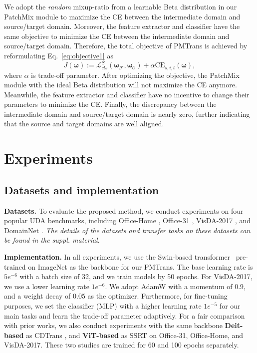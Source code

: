 \documentclass[10pt,twocolumn,letterpaper, ]{article}
\begin{document}
We adopt the \textit{random} mixup-ratio from a learnable Beta distribution in our PatchMix module to maximize the CE between the intermediate domain and source/target domain. Moreover, the feature extractor and classifier have the same objective to minimize the CE between the intermediate domain and source/target domain.
Therefore, the total objective of PMTrans is achieved by reformulating Eq.~\ref{eq:objective1} as
\[
J\left(\boldsymbol{\omega}\right) :=\mathcal{L}_{cls}^{S}(\boldsymbol{\omega}_{\mathcal{F}}, \boldsymbol{\omega}_{\mathcal{C}})+\alpha {\text{CE}}_{s,i,t}(\boldsymbol{\omega}),
\]
where $\alpha$ is trade-off parameter. 
After optimizing the objective, the PatchMix module with the ideal Beta distribution
will not maximize the CE anymore. Meanwhile, the feature extractor and classifier have no incentive to change their parameters to minimize the CE. Finally, the discrepancy between the intermediate domain and  source/target domain is nearly zero, further indicating that the source and target domains are well aligned.
\section{Experiments}
\subsection{Datasets and implementation}
\noindent\textbf{Datasets.} To evaluate the proposed method, we conduct experiments on four popular UDA benchmarks, including Office-Home \cite{VenkateswaraECP17}, Office-31 \cite{SaenkoKFD10}, VisDA-2017 \cite{abs-1710-06924}, and DomainNet \cite{PengBXHSW19}.
\textit{The details of the datasets and transfer tasks on these datasets can be found in the suppl. material}.

\noindent\textbf{Implementation.} In all experiments, we use the Swin-based transformer~\cite{Liu2021SwinTH}  pre-trained on ImageNet \cite{DengDSLL009} as the backbone for our PMTrans. The base learning rate is $5e^{-6}$ with a batch size of 32, and we train models by 50 epochs. For VisDA-2017, we use a lower learning rate $1e^{-6}$. We adopt AdamW \cite{LoshchilovH19} with a momentum of $0.9$, and a weight decay of $0.05$ as the optimizer. Furthermore, for fine-tuning purposes, we set the classifier (MLP) with a higher learning rate $1e^{-5}$ for our main tasks and learn the trade-off parameter adaptively. For a fair comparison with prior works, we also conduct experiments with the same backbone \textbf{Deit-based} \cite{DBLP:journals/corr/abs-2012-12877} as CDTrans \cite{abs-2109-06165}, and \textbf{ViT-based} \cite{Dosovitskiy2021AnII} as SSRT \cite{abs-2204-07683} on Office-31, Office-Home, and VisDA-2017. These two studies are trained for 60 and 100 epochs separately. 
\end{document}
